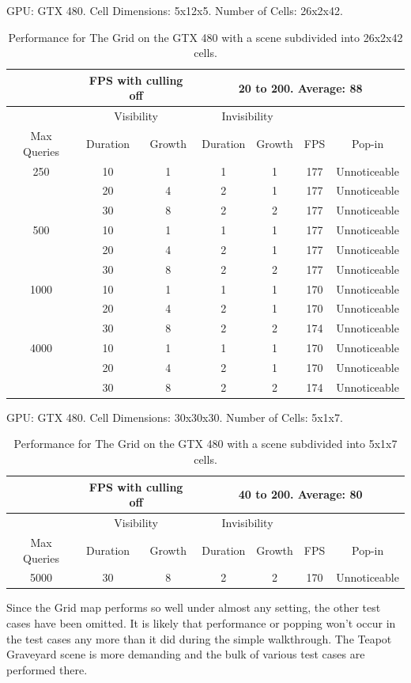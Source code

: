 \documentclass[12pt]{ucthesis}
\newcommand{\captionfonts}{\small\bf\ssp}
\begin{document}
\begin{table}
\begin{center}
GPU: GTX 480.   Cell Dimensions: 5x12x5.   Number of Cells: 26x2x42.
\begin{tabular}{|c|c|c|c|c|c|c|}
\hline
&\multicolumn{2}{c|}{FPS with culling off}&\multicolumn{4}{c|}{20 to 200.  Average: 88}
\tabularnewline
\hline 
&\multicolumn{2}{c|}{Visibility}&\multicolumn{2}{c|}{Invisibility}&&
\tabularnewline
Max Queries&Duration&Growth&Duration&Growth&FPS&Pop-in
\tabularnewline
\hline
250 & 10& 1& 1& 1& 177& Unnoticeable
\tabularnewline
     & 20& 4& 2& 1& 177& Unnoticeable
\tabularnewline
     & 30& 8& 2& 2& 177& Unnoticeable
\tabularnewline
\hline
500 & 10& 1& 1& 1& 177& Unnoticeable
\tabularnewline
     & 20& 4& 2& 1& 177& Unnoticeable
\tabularnewline
     & 30& 8& 2& 2& 177& Unnoticeable
\tabularnewline
\hline
1000 & 10& 1& 1& 1& 170& Unnoticeable
\tabularnewline
     & 20& 4& 2& 1& 170& Unnoticeable
\tabularnewline
     & 30& 8& 2& 2& 174& Unnoticeable
\tabularnewline
\hline
4000 & 10& 1& 1& 1& 170& Unnoticeable
\tabularnewline
     & 20& 4& 2& 1& 170& Unnoticeable
\tabularnewline
     & 30& 8& 2& 2& 174& Unnoticeable
\tabularnewline 
\hline 
\end{tabular}
\captionfonts
\caption[Performance for The Grid]{Performance for The Grid on the GTX 480 with a scene subdivided into 26x2x42 cells.}
\label{table:the-grid-performance-b}
\end{center}
\end{table}

\begin{table}
\begin{center}
GPU: GTX 480.   Cell Dimensions: 30x30x30.   Number of Cells: 5x1x7.
\begin{tabular}{|c|c|c|c|c|c|c|}
\hline
&\multicolumn{2}{c|}{FPS with culling off}&\multicolumn{4}{c|}{40 to 200.  Average: 80}
\tabularnewline
\hline 
&\multicolumn{2}{c|}{Visibility}&\multicolumn{2}{c|}{Invisibility}&&
\tabularnewline
Max Queries&Duration&Growth&Duration&Growth&FPS&Pop-in
\tabularnewline
\hline
5000 & 30& 8& 2& 2& 170& Unnoticeable
\tabularnewline
\hline 
\end{tabular}
\captionfonts
\caption[Performance for The Grid]{Performance for The Grid on the GTX 480 with a scene subdivided into 5x1x7 cells.}
\label{table:the-grid-performance-c}
\end{center}
\end{table}

Since the Grid map performs so well under almost any setting, the other test cases have been omitted.
It is likely that performance or popping won't occur in the test cases any more than it did during the simple walkthrough.
The Teapot Graveyard scene is more demanding and the bulk of various test cases are performed there.
\end{document}
